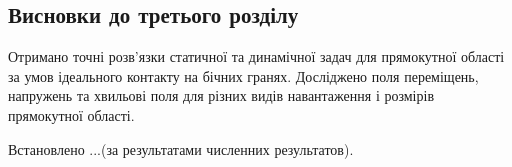 \subsection{Висновки до третього розділу}
Отримано точні розв'язки статичної та динамічної задач для прямокутної області за умов ідеального контакту на бічних гранях.
Досліджено поля переміщень, напружень та хвильові поля для різних видів навантаження і розмірів прямокутної області.

Встановлено ...(за результатами численних результатов).
